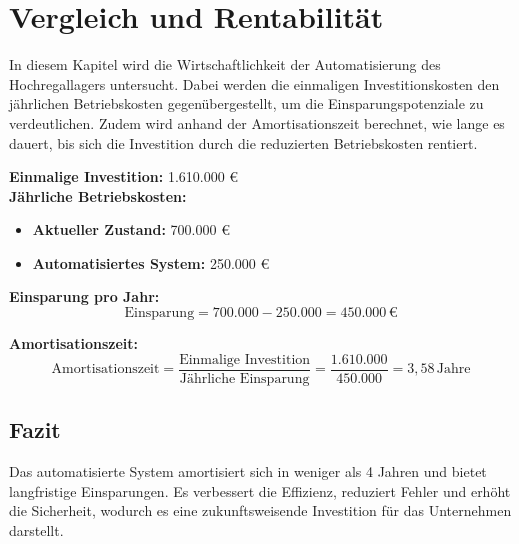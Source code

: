 \section{Vergleich und Rentabilität}
In diesem Kapitel wird die Wirtschaftlichkeit der Automatisierung des Hochregallagers untersucht. Dabei werden die einmaligen Investitionskosten den jährlichen Betriebskosten gegenübergestellt, um die Einsparungspotenziale zu verdeutlichen. Zudem wird anhand der Amortisationszeit berechnet, wie lange es dauert, bis sich die Investition durch die reduzierten Betriebskosten rentiert. 

\textbf{Einmalige Investition:} 1.610.000 € \\

\textbf{Jährliche Betriebskosten:}
\begin{itemize}
	\item \textbf{Aktueller Zustand:} 700.000 €
	\item \textbf{Automatisiertes System:} 250.000 €
\end{itemize}

\textbf{Einsparung pro Jahr:}  
\[
\text{Einsparung} = 700.000 - 250.000 = 450.000 \, \text{€}
\]

\textbf{Amortisationszeit:}  
\[
\text{Amortisationszeit} = \frac{\text{Einmalige Investition}}{\text{Jährliche Einsparung}} = \frac{1.610.000}{450.000} = 3{,}58\, \text{Jahre}
\]

\subsection*{Fazit}
Das automatisierte System amortisiert sich in weniger als 4 Jahren und bietet langfristige Einsparungen. Es verbessert die Effizienz, reduziert Fehler und erhöht die Sicherheit, wodurch es eine zukunftsweisende Investition für das Unternehmen darstellt.


